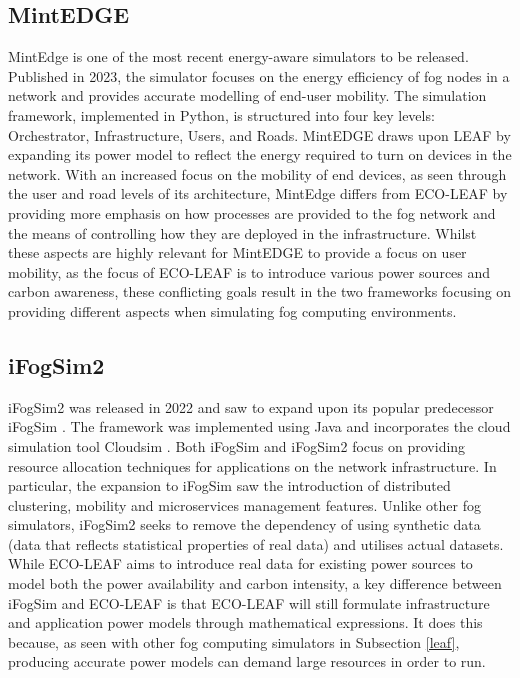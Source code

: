 \documentclass{l4proj}
\begin{document}
\subsection{MintEDGE}
MintEdge \citep{mintedge} is one of the most recent energy-aware simulators to be released.
Published in 2023, the simulator focuses on the energy efficiency of fog nodes in a network and provides accurate modelling of end-user mobility.
The simulation framework, implemented in Python, is structured into four key levels: Orchestrator, Infrastructure, Users, and Roads.
MintEDGE draws upon LEAF by expanding its power model to reflect the energy required to turn on devices in the network.
With an increased focus on the mobility of end devices, as seen through the user and road levels of its architecture, MintEdge differs from ECO-LEAF by providing more emphasis on how processes are provided to the fog network and the means of controlling how they are deployed in the infrastructure.
Whilst these aspects are highly relevant for MintEDGE to provide a focus on user mobility, as the focus of ECO-LEAF is to introduce various power sources and carbon awareness, these conflicting goals result in the two frameworks focusing on providing different aspects when simulating fog computing environments.

\subsection{iFogSim2}
iFogSim2 \citep{IFOGSIM2} was released in 2022 and saw to expand upon its popular predecessor iFogSim \citep{IFOGSIM}.
The framework was implemented using Java and incorporates the cloud simulation tool Cloudsim \citep{cloudsim}.
Both iFogSim and iFogSim2 focus on providing resource allocation techniques for applications on the network infrastructure.
In particular, the expansion to iFogSim saw the introduction of distributed clustering, mobility and microservices management features.
Unlike other fog simulators, iFogSim2 seeks to remove the dependency of using synthetic data (data that reflects statistical properties of real data) and utilises actual datasets.
While ECO-LEAF aims to introduce real data for existing power sources to model both the power availability and carbon intensity, a key difference between iFogSim and ECO-LEAF is that ECO-LEAF will still formulate infrastructure and application power models through mathematical expressions.
It does this because, as seen with other fog computing simulators in Subsection \ref{leaf}, producing accurate power models can demand large resources in order to run.
\end{document}
